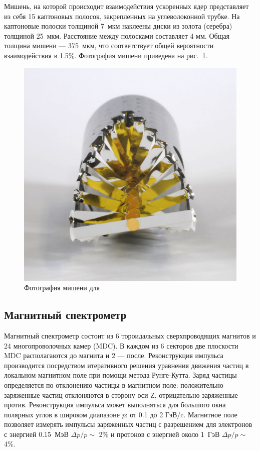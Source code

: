 Мишень, на которой происходит взаимодействия ускоренных ядер представляет из себя 15 каптоновых полосок, закрепленных на углеволоконной трубке.
На каптоновые полоски толщиной 7~мкм наклеены диски из золота (серебра) толщиной 25~мкм.
Расстояние между полосками составляет 4 мм. 
Общая толщина мишени --- 375~мкм, что соответствует общей вероятности взаимодействия в 1.5\%.
Фотография мишени приведена на рис.~\ref{fig:hades_target}. 
%
\begin{figure}[ht]
\begin{center}
\includegraphics[width=0.75\linewidth]{images/hades_target.jpg}
\caption{ Фотография мишени для  }
\label{fig:hades_target}
\end{center}
\end{figure}

\subsection{ Магнитный спектрометр }

Магнитный спектрометр состоит из 6 тороидальных сверхпроводящих магнитов и 24 многопроволочных камер (MDC).
В каждом из 6 секторов две плоскости MDC располагаются до магнита и 2 --- после. 
Реконструкция импульса производится посредством итеративного решения уравнения движения частиц в локальном магнитном поле при помощи метода Рунге-Кутта.
Заряд частицы определяется по отклонению частицы в магнитном поле: положительно заряженные частиц отклоняются в сторону оси Z, отрицательно заряженные --- против.
Реконструкция импульса может выполняться для большого окна полярных углов в широком диапазоне $p$: от 0.1 до 2 ГэВ/c.
Магнитное поле позволяет измерять импульсы заряженных частиц с разрешением для электронов с энергией 0.15~МэВ $\Delta p/p \sim$ 2\% и протонов с энергией около 1~ГэВ $\Delta p/p \sim$ 4\%.  

